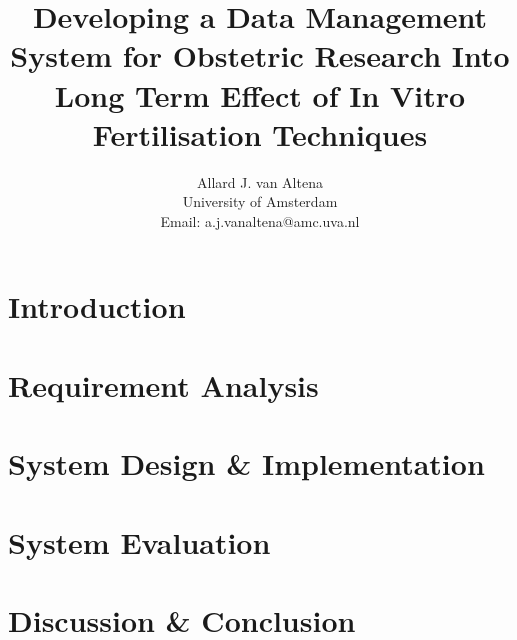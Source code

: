\documentclass[a4paper]{report}
\title{Developing a Data Management System for Obstetric Research Into Long Term Effect of In Vitro Fertilisation Techniques}
\author{
	Allard J. van Altena\\
	University of Amsterdam\\
	Email: a.j.vanaltena@amc.uva.nl
}
\newcommand{\project}{IVF-PRN project}
\newcommand{\ivfsystem}{IVF-PRN system}
\begin{document}
	
	\tableofcontents
	
	\chapter{Introduction}
	\label{introduction}

	
	
	
	
	\chapter{Requirement Analysis}
	\label{requirements}
	
	
	
	
	
	
	
	
	
	
	
	\chapter{System Design \& Implementation}
	\label{system-functionality}
	
	
	
	
	
	
	
	
	
	\chapter{System Evaluation}
	\label{evaluation}
	
	
	
	
	\chapter{Discussion \& Conclusion}
	\label{discussion}
	
\end{document}

